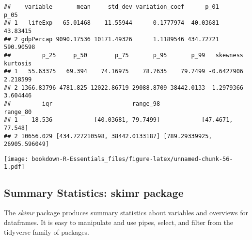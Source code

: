 \documentclass[]{book}
\newenvironment{Shaded}{\begin{snugshade}}{\end{snugshade}}
\newcommand{\KeywordTok}[1]{\textcolor[rgb]{0.13,0.29,0.53}{\textbf{#1}}}
\newcommand{\DecValTok}[1]{\textcolor[rgb]{0.00,0.00,0.81}{#1}}
\newcommand{\StringTok}[1]{\textcolor[rgb]{0.31,0.60,0.02}{#1}}
\newcommand{\CommentTok}[1]{\textcolor[rgb]{0.56,0.35,0.01}{\textit{#1}}}
\newcommand{\OperatorTok}[1]{\textcolor[rgb]{0.81,0.36,0.00}{\textbf{#1}}}
\newcommand{\NormalTok}[1]{#1}
\begin{document}
\begin{Shaded}
\end{Shaded}

\begin{verbatim}
##    variable       mean     std_dev variation_coef      p_01      p_05
## 1   lifeExp   65.01468    11.55944      0.1777974  40.03681  43.83415
## 2 gdpPercap 9090.17536 10171.49326      1.1189546 434.72721 590.90598
##         p_25     p_50        p_75       p_95       p_99   skewness kurtosis
## 1   55.63375   69.394    74.16975    78.7635    79.7499 -0.6427906 2.218599
## 2 1366.83796 4781.825 12022.86719 29088.8709 38442.0133  1.2979366 3.604446
##         iqr                       range_98                     range_80
## 1    18.536            [40.03681, 79.7499]            [47.4671, 77.548]
## 2 10656.029 [434.727210598, 38442.0133187] [789.29339925, 26905.596049]
\end{verbatim}

\begin{Shaded}
\end{Shaded}

\texttt{[image: bookdown-R-Essentials\_files/figure-latex/unnamed-chunk-56-1.pdf]}

\subsection{Summary Statistics: skimr
package}\label{summary-statistics-skimr-package}

The \emph{skimr} package produces summary statistics about variables and
overviews for dataframes. It is easy to manipulate and use pipes,
select, and filter from the tidyverse family of packages.
\end{document}
